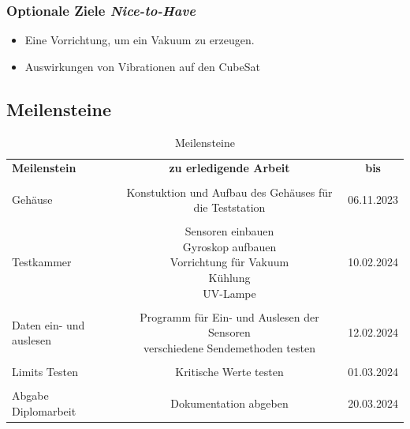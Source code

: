 \subsubsection{Optionale Ziele \textit{Nice-to-Have}}
\begin{itemize}
    \item  Eine Vorrichtung, um ein Vakuum zu erzeugen.
    \item  Auswirkungen von Vibrationen auf den CubeSat
\end{itemize}

\subsection{ Meilensteine}

\begin{table}[h]
    \centering
\begin{tabular}{  l | c | c  } 
  
  \textbf{ Meilenstein} & \textbf{ zu erledigende Arbeit} & \textbf{ bis}\\
  \vspace{2mm}
   \\
   Gehäuse & \parbox{5cm}{Konstuktion und Aufbau des Gehäuses für die Teststation}   & 06.11.2023 \\ 
  \vspace{2mm}
   \\
   Testkammer & \parbox{5cm}{Sensoren einbauen \\ Gyroskop aufbauen \\  Vorrichtung für Vakuum \\ Kühlung \\ UV-Lampe }& 10.02.2024 \\ 
  \vspace{2mm}
   \\
   Daten ein- und auslesen & \parbox{5cm}{Programm für Ein- und Auslesen der Sensoren\\ verschiedene Sendemethoden testen} & 12.02.2024 \\ 
  \vspace{2mm}
   \\
   Limits Testen & Kritische Werte testen & 01.03.2024\\
  \vspace{2mm}
   \\
   Abgabe Diplomarbeit & Dokumentation abgeben & 20.03.2024\\
 
\end{tabular}
    \caption{Meilensteine}
\end{table}
\newpage
